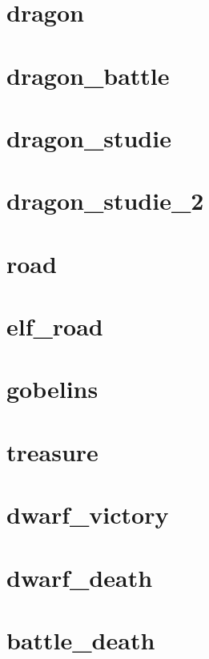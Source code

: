 \section{dragon}
\section{dragon_battle}
\section{dragon_studie}
\section{dragon_studie_2}
\section{road}
\section{elf_road}
\section{gobelins}
\section{treasure}
\section{dwarf_victory}
\section{dwarf_death}
\section{battle_death}
